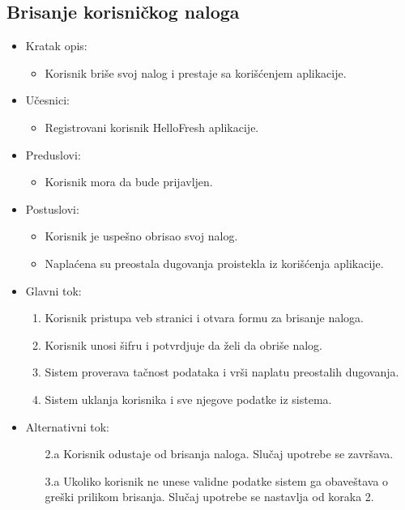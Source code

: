 \subsection{Brisanje korisničkog naloga}

\begin{itemize}
    \item Kratak opis:
        \begin{itemize}
            \item Korisnik briše svoj nalog i prestaje sa korišćenjem aplikacije.
        \end{itemize}
    \item Učesnici:
        \begin{itemize}
            \item Registrovani korisnik HelloFresh aplikacije.
        \end{itemize}
    \item Preduslovi:
        \begin{itemize}
            \item Korisnik mora da bude prijavljen.
        \end{itemize}
    \item Postuslovi:
        \begin{itemize}
            \item Korisnik je uspešno obrisao svoj nalog.
            \item Naplaćena su preostala dugovanja proistekla iz korišćenja aplikacije.
        \end{itemize}
    \item Glavni tok:
        \begin{enumerate}
            \item Korisnik pristupa veb stranici i otvara formu za brisanje naloga.
            \item Korisnik unosi šifru i potvrdjuje da želi da obriše nalog.
            \item Sistem proverava tačnost podataka i vrši naplatu preostalih dugovanja.
            \item Sistem uklanja korisnika i sve njegove podatke iz sistema.
        \end{enumerate}
    \item Alternativni tok:
        \begin{itemize}
            \item[2.a] Korisnik odustaje od brisanja naloga. Slučaj upotrebe se završava.
			\item[3.a] Ukoliko korisnik ne unese validne podatke sistem ga obaveštava o greški prilikom brisanja. Slučaj upotrebe se nastavlja od koraka 2.
        \end{itemize}
\end{itemize}
